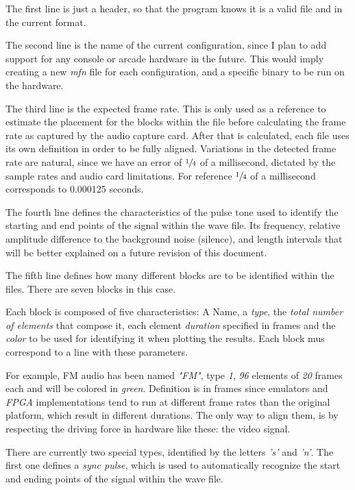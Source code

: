 \documentclass[10pt,a4paper]{report}
\begin{document}
The first line is just a header, so that the program knows it is a valid file and in the current format.

The second line is the name of the current configuration, since I plan to add support for any console or arcade hardware in the future. This would imply creating a new \textit{mfn} file for each configuration, and a specific binary to be run on the hardware.

The third line is the expected frame rate. This is only used as a reference to estimate the placement for the blocks within the file before calculating the frame rate as captured by the audio capture card. After that is calculated, each file uses its own definition in order to be fully aligned. Variations in the detected frame rate are natural, since we have an error of $\sfrac{1}{4}$ of a millisecond, dictated by the sample rates and audio card limitations. For reference $\sfrac{1}{4}$ of a millisecond corresponds to 0.000125 seconds.

The fourth line defines the characteristics of the pulse tone used to identify the starting and end points of the signal within the wave file. Its frequency, relative amplitude difference to the background noise (silence), and length intervals that will be better explained on a future revision of this document.

The fifth line defines how many different blocks are to be identified within the files. There are seven blocks in this case.

Each block is composed of five characteristics: A Name, a \textit{type}, the \textit{total number of elements} that compose it, each element \textit{duration} specified in frames and the \textit{color} to be used for identifying it when plotting the results. Each block mus correspond to a line with these parameters.

For example, FM audio has been named \textit{"FM"}, type \textit{1}, \textit{96} elements of \textit{20} frames each and will be colored in \textit{green}. Definition is in frames since emulators and \textit{FPGA} implementations tend to run at different frame rates than the original platform, which result in different durations. The only way to align them, is by respecting the driving force in hardware like these: the video signal.

There are currently two special types, identified by the letters \textit{'s'} and \textit{'n'}. The first one defines a \textit{sync pulse}, which is used to automatically recognize the start and ending points of the signal within the wave file. 
\end{document}
